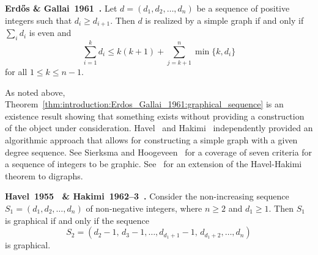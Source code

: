 \begin{theorem}
\label{thm:introduction:Erdos_Gallai_1961:graphical_sequence}
\textbf{Erd\H{o}s \& Gallai~1961~\cite{ErdosGallai1960}.}
Let $d = (d_1, d_2, \dots, d_n)$ be a sequence of positive integers
such that $d_i \geq d_{i+1}$. Then $d$ is realized by a simple graph
if and only if $\sum_i d_i$ is even and
\begin{equation}
\label{eqn:introduction:Erdos_Gallai_1961:graphical_sequence}
\sum_{i=1}^k d_i
\leq
k(k + 1) + \sum_{j=k+1}^n \min\{k, d_i\}
\end{equation}
for all $1 \leq k \leq n - 1$.
\end{theorem}

As noted above,
Theorem~\ref{thm:introduction:Erdos_Gallai_1961:graphical_sequence} is
an existence result showing that something exists without providing a
construction of the object under consideration.
Havel~\cite{Havel1955}
and Hakimi~\cite{Hakimi1962,Hakimi1963}
independently provided an algorithmic approach that allows for
constructing a simple graph with a given degree sequence. See Sierksma
and Hoogeveen~\cite{SierksmaHoogeveen1991} for a coverage of seven
criteria for a sequence of integers to be graphic.
See~\cite{ErdosEtAl2010} for an extension of the
Havel-Hakimi theorem to digraphs.

\begin{theorem}
\label{thm:introduction:Havel1955_Hakimi1962:graphical_sequence}
\textbf{Havel~1955~\cite{Havel1955} \&
  Hakimi~1962--3~\cite{Hakimi1962,Hakimi1963}.}
Consider the non-increasing sequence $S_1 = (d_1, d_2, \dots, d_n)$ of
non-negative integers, where $n \geq 2$ and $d_1 \geq 1$. Then $S_1$ is
graphical if and only if the sequence
\[
S_2
=
(d_2 - 1,\, d_3 - 1, \dots, d_{d_1 + 1} - 1,\, d_{d_1 + 2}, \dots, d_n)
\]
is graphical.
\end{theorem}

